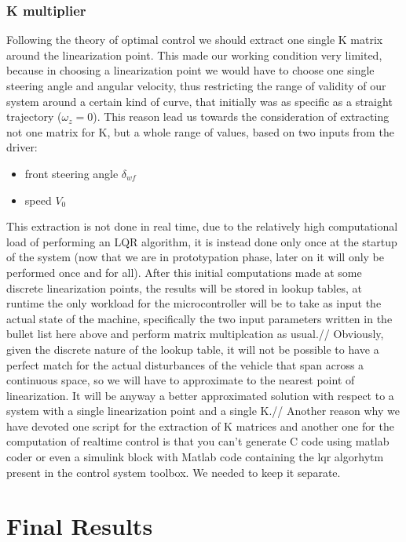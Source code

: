 \documentclass[a4paper,12pt,titlepage]{report}
\numberwithin{figure}{section}
\begin{document}
\subsection{K multiplier}
Following the theory of optimal control we should extract one single K matrix around the linearization point. This made our working condition very limited, because in choosing a linearization point we would have to choose one single steering angle and angular velocity, thus restricting the range of validity of our system around a certain kind of curve, that initially was as specific as a straight trajectory ($\omega_{z}=0$).
This reason lead us towards the consideration of extracting not one matrix for K, but a whole range of values, based on two inputs from the driver:
\begin{itemize}
	\item front steering angle $\delta_{wf}$
	\item speed $V_0$
\end{itemize}	
This extraction is not done in real time, due to the relatively high computational load of performing an LQR algorithm, it is instead done only once at the startup of the system (now that we are in prototypation phase, later on it will only be performed once and for all). After this initial computations made at some discrete linearization points, the results will be stored in lookup tables, at runtime the only workload for the microcontroller will be to take as input the actual state of the machine, specifically the two input parameters written in the bullet list here above and perform matrix multiplcation as usual.//
Obviously, given the discrete nature of the lookup table, it will not be possible to have a perfect match for the actual disturbances of the vehicle that span across a continuous space, so we will have to approximate to the nearest point of linearization. It will be anyway a better approximated solution with respect to a system with a single linearization point and a single K.//
Another reason why we have devoted one script for the extraction of K matrices and another one for the computation of realtime control is that you can't generate C code using matlab coder or even a simulink block with Matlab code containing the lqr algorhytm present in the control system toolbox. We needed to keep it separate.
\chapter{Final Results}
\end{document}
